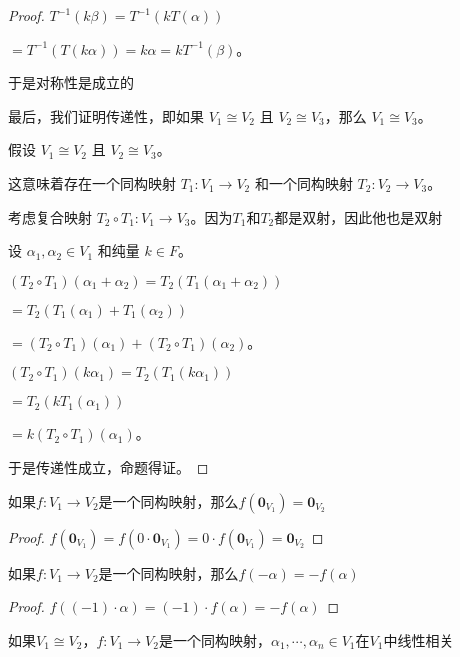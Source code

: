 \documentclass[12pt, a4paper, oneside, UTF8]{ctexbook}
\begin{document}
\begin{para}{0}
\begin{proof}
						$T^{-1}(k\beta ) = T^{-1}(k T(\alpha ))$

						$= T^{-1}(T(k \alpha )) = k \alpha  = k T^{-1}(\beta )$。
						
						于是对称性是成立的

						最后，我们证明传递性，即如果 $V_1 \cong V_2$ 且 $V_2 \cong V_3$，那么 $V_1 \cong V_3$。

						假设 $V_1 \cong V_2$ 且 $V_2 \cong V_3$。
						
						这意味着存在一个同构映射 $T_1: V_1 \to V_2$ 和一个同构映射 $T_2: V_2 \to V_3$。

						考虑复合映射 $T_2 \circ T_1: V_1 \to V_3$。因为$T_1$和$T_2$都是双射，因此他也是双射

						设 $\alpha _1, \alpha _2 \in V_1$ 和纯量 $k \in F$。
						
						$(T_2 \circ T_1)(\alpha _1 + \alpha _2) = T_2(T_1(\alpha _1 + \alpha _2))$

						$= T_2(T_1(\alpha _1) + T_1(\alpha _2))$

						$= (T_2 \circ T_1)(\alpha _1) + (T_2 \circ T_1)(\alpha _2)$。

						$(T_2 \circ T_1)(k \alpha _1) = T_2(T_1(k \alpha _1))$

						$= T_2(k T_1(\alpha _1))$

						$= k (T_2 \circ T_1)(\alpha _1)$。
						
						于是传递性成立，命题得证。
					\end{proof}
				\point{}
					\begin{proposition}
						如果$f:V_1 \to V_2$是一个同构映射，那么$f(\mathbf{0}_{V_1})=\mathbf{0}_{V_2}$
					\end{proposition}
					\begin{proof}
						$f(\mathbf{0}_{V_1})=f(0\cdot \mathbf{0}_{V_1})=0\cdot f(\mathbf{0}_{V_1})=\mathbf{0}_{V_2}$
					\end{proof}
				\point{}
					\begin{proposition}
						如果$f:V_1 \to V_2$是一个同构映射，那么$f(-\alpha )=-f(\alpha )$
					\end{proposition}
					\begin{proof}
						$f\left((-1)\cdot \alpha \right)=(-1)\cdot f(\alpha )=-f(\alpha )$
					\end{proof}
				\point{}
					\begin{proposition}
						如果$V_1 \cong V_2$，$f:V_1 \to V_2$是一个同构映射，$\alpha_1,\cdots,\alpha_n \in V_1$在$V_1$中线性相关


\end{proposition}
\end{para}
\end{document}
